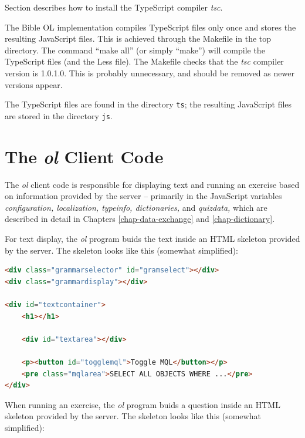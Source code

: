 \documentclass[11pt,oneside,a4paper]{memoir}
\begin{document}
Section \label{sec-installing-tsc} describes how to install the TypeScript compiler \emph{tsc}.

The Bible OL implementation
compiles TypeScript files only once and stores the resulting JavaScript files. This is achieved through the
Makefile in the top directory. The command ``make all'' (or simply ``make'') will compile the
TypeScript files (and the Less file). The Makefile checks that the \emph{tsc} compiler version is 1.0.1.0. This
is probably unnecessary, and should be removed as newer versions appear.

The TypeScript files are found in the directory \texttt{ts}; the resulting JavaScript files are
stored in the directory \texttt{js}.

\section{The \emph{ol} Client Code}\label{sec-ol}

The \emph{ol} client code is responsible for displaying text and running an exercise based on
information provided by the server -- primarily in the JavaScript variables \emph{configuration,
  localization, typeinfo, dictionaries,} and \emph{quizdata,} which are described in detail in
Chapters \ref{chap-data-exchange} and \ref{chap-dictionary}.

For text display, the \emph{ol} program buids the text inside an HTML skeleton provided by the
server. The skeleton looks like this (somewhat simplified):


\begin{lstlisting}[language=HTML]
<div class="grammarselector" id="gramselect"></div>
<div class="grammardisplay"></div>
 
<div id="textcontainer">
    <h1></h1>
   
    <div id="textarea"></div>

    <p><button id="togglemql">Toggle MQL</button></p>
    <pre class="mqlarea">SELECT ALL OBJECTS WHERE ...</pre>
</div>
\end{lstlisting}

When running an exercise, the \emph{ol} program buids a question inside an HTML skeleton provided by the
server. The skeleton looks like this (somewhat simplified):
\end{document}

